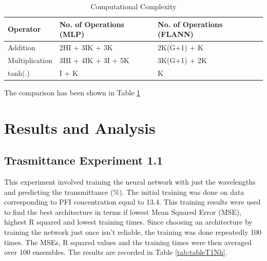 \documentclass[]{article}
\begin{document}
\begin{table}[t]

\caption{\label{tab:CompComplex}Computational Complexity}
\centering
\begin{tabular}{l|l|l}
\hline
\textbf{Operator} & \textbf{No. of Operations (MLP)} & \textbf{No. of Operations (FLANN)}\\
\hline
Addition & 2HI + 3IK + 3K & 2K(G+1) + K\\
\hline
Multiplication & 3HI + 4IK + 3I + 5K & 3K(G+1) + 2K\\
\hline
tanh(.) & I + K & K\\
\hline
\end{tabular}
\end{table}

The comparison has been shown in Table \ref{tab:CompComplex}

\clearpage

\hypertarget{results-and-analysis}{%
\section{Results and Analysis}\label{results-and-analysis}}

\hypertarget{trasmittance-experiment-1.1}{%
\subsection{Trasmittance Experiment 1.1}\label{trasmittance-experiment-1.1}}

This experiment involved training the neural network with just the wavelengths and predicting the transmittance (\%). The initial training was done on data corresponding to PFI concentration equal to 13.4. This training results were used to find the best architecture in terms if lowest Mean Squared Error (MSE), highest R squared and lowest training times. Since choosing an architecture by training the network just once isn't reliable, the training was done repeatedly 100 times. The MSEs, R squared values and the training times were then averaged over 100 ensembles. The results are recorded in Table \ref{tab:tableT1Nh}.
\end{document}
